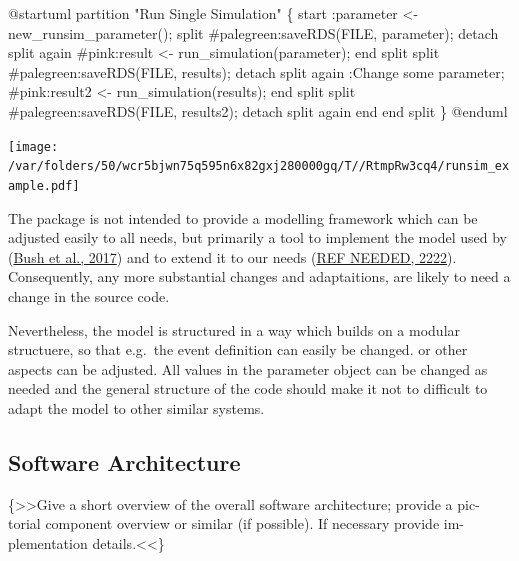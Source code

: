 \documentclass[]{elsarticle} %
\newenvironment{Shaded}{\begin{snugshade}}{\end{snugshade}}
\newcommand{\NormalTok}[1]{#1}
\begin{document}
\begin{Shaded}
\begin{Highlighting}[]
\NormalTok{@startuml}
\NormalTok{partition "Run Single Simulation" \{}
\NormalTok{   start}
\NormalTok{  :parameter \textless{}{-} new\_runsim\_parameter();}
\NormalTok{  split}
\NormalTok{    \#palegreen:saveRDS(FILE, parameter);}
\NormalTok{    detach}
\NormalTok{  split again}
\NormalTok{    \#pink:result \textless{}{-} run\_simulation(parameter);}
\NormalTok{  end split}
\NormalTok{  split}
\NormalTok{    \#palegreen:saveRDS(FILE, results);}
\NormalTok{    detach}
\NormalTok{  split again}
\NormalTok{    :Change some parameter;}
\NormalTok{    \#pink:result2 \textless{}{-} run\_simulation(results);}
\NormalTok{  end split}
\NormalTok{  split}
\NormalTok{    \#palegreen:saveRDS(FILE, results2);}
\NormalTok{    detach}
\NormalTok{  split again}
\NormalTok{    end}
\NormalTok{  end split}
\NormalTok{\}}
\NormalTok{@enduml}
\end{Highlighting}
\end{Shaded}

\texttt{[image: /var/folders/50/wcr5bjwn75q595n6x82gxj280000gq/T//RtmpRw3cq4/runsim\_example.pdf]}

The package is not intended to provide a modelling framework which can
be adjusted easily to all needs, but primarily a tool to implement the
model used by (\protect\hyperlink{ref-Bush2017}{Bush et al., 2017}) and
to extend it to our needs (\protect\hyperlink{ref-REF_NEEDED}{REF
NEEDED, 2222}). Consequently, any more substantial changes and
adaptaitions, are likely to need a change in the source code.

Nevertheless, the model is structured in a way which builds on a modular
structuere, so that e.g.~the event definition can easily be changed. or
other aspects can be adjusted. All values in the parameter object can be
changed as needed and the general structure of the code should make it
not to difficult to adapt the model to other similar systems.

\hypertarget{software-architecture}{%
\subsection{Software Architecture}\label{software-architecture}}

\{\textgreater\textgreater Give a short overview of the overall software
architecture; provide a pic- torial component overview or similar (if
possible). If necessary provide im- plementation
details.\textless\textless\}
\end{document}
